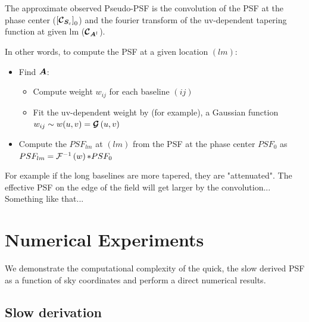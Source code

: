 The approximate observed Pseudo-PSF is the convolution of the PSF at
the phase center ($\left[\bm{\mathcal{C}}_{\bm{S}_{c}}\right]_0$) and the fourier transform of the uv-dependent tapering function at given
lm ($\bm{\mathcal{C}}_{\bm{A}^l}$).

In other words, to compute the PSF at a given location $(lm)$:

\begin{itemize}
  \item Find $\bm{A}$:
    \begin{itemize}
    \item Compute weight $w_{ij}$ for each baseline $(ij)$
    \item Fit the uv-dependent weight by (for example), a Gaussian function $w_{ij}\sim w(u,v)=\bm{\mathcal{G}}\left(u,v\right)$ 
    \end{itemize}
  \item Compute the $PSF_{lm}$ at $(lm)$ from the PSF at the phase center $PSF_0$ as $PSF_{lm}=\mathcal{F}^{-1}\left(w\right)\mathcal{*} PSF_0$
\end{itemize}
For example if the long baselines are more tapered, they are
"attenuated". The effective PSF on the edge of the field will get
larger by the convolution...
Something like that...
\section{Numerical Experiments}
We demonstrate the computational complexity of the quick, the slow derived PSF as a function of sky coordinates and 
perform a direct numerical results.
\subsection{Slow derivation}
